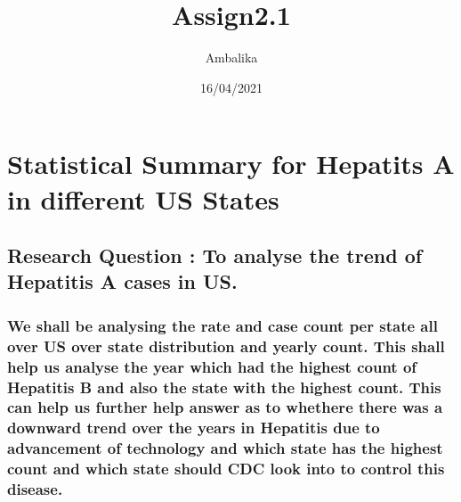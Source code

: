 \documentclass[
]{article}
\title{Assign2.1}
\author{Ambalika}
\date{16/04/2021}
\begin{document}
\maketitle

\hypertarget{statistical-summary-for-hepatits-a-in-different-us-states}{%
\section{Statistical Summary for Hepatits A in different US
States}\label{statistical-summary-for-hepatits-a-in-different-us-states}}

\hypertarget{research-question-to-analyse-the-trend-of-hepatitis-a-cases-in-us.}{%
\subsection{Research Question : To analyse the trend of Hepatitis A
cases in
US.}\label{research-question-to-analyse-the-trend-of-hepatitis-a-cases-in-us.}}

\hypertarget{we-shall-be-analysing-the-rate-and-case-count-per-state-all-over-us-over-state-distribution-and-yearly-count.-this-shall-help-us-analyse-the-year-which-had-the-highest-count-of-hepatitis-b-and-also-the-state-with-the-highest-count.-this-can-help-us-further-help-answer-as-to-whethere-there-was-a-downward-trend-over-the-years-in-hepatitis-due-to-advancement-of-technology-and-which-state-has-the-highest-count-and-which-state-should-cdc-look-into-to-control-this-disease.}{%
\subsubsection{We shall be analysing the rate and case count per state
all over US over state distribution and yearly count. This shall help us
analyse the year which had the highest count of Hepatitis B and also the
state with the highest count. This can help us further help answer as to
whethere there was a downward trend over the years in Hepatitis due to
advancement of technology and which state has the highest count and
which state should CDC look into to control this
disease.}\label{we-shall-be-analysing-the-rate-and-case-count-per-state-all-over-us-over-state-distribution-and-yearly-count.-this-shall-help-us-analyse-the-year-which-had-the-highest-count-of-hepatitis-b-and-also-the-state-with-the-highest-count.-this-can-help-us-further-help-answer-as-to-whethere-there-was-a-downward-trend-over-the-years-in-hepatitis-due-to-advancement-of-technology-and-which-state-has-the-highest-count-and-which-state-should-cdc-look-into-to-control-this-disease.}}
\end{document}

